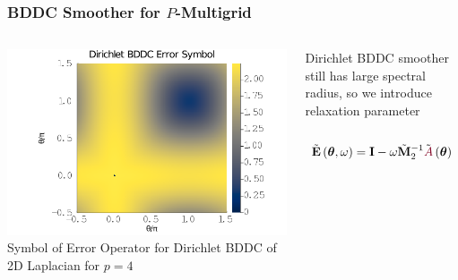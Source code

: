 \documentclass{beamer}
\begin{document}
\begin{frame}
\begin{center}
\frametitle{BDDC Smoother for $P$-Multigrid}

\begin{columns}[onlytextwidth]
  \begin{column}{0.49\textwidth}
  \begin{center}
  \includegraphics[width=1.0\textwidth]{../img/DirichletBDDCHighOrderNoRelaxation}
  {\small Symbol of Error Operator for Dirichlet BDDC of 2D Laplacian for $p = 4$}
  \end{center}
  \end{column}

  \begin{column}{0.45\textwidth}
  \begin{center}
  Dirichlet BDDC smoother still has large spectral radius, so we introduce relaxation parameter\\

  ~\\

  \begin{equation}
  \tilde{\mathbf{E}} \left( \boldsymbol{\theta}, \omega \right) = \mathbf{I} - \omega \tilde{\mathbf{M}}_2^{-1} \tilde{{\color{burgundy}A}} \left( \boldsymbol{\theta} \right)
  \end{equation}
  \end{center}
  \end{column}
\end{columns}

\end{center}
\end{frame}

\end{document}
